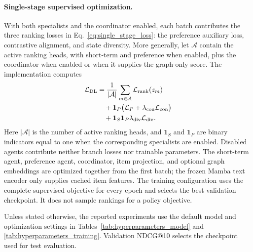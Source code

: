 ﻿\documentclass[sigconf,anonymous,review]{acmart}
\begin{document}
\paragraph{Single-stage supervised optimization.}
With both specialists and the coordinator enabled, each batch contributes the three ranking losses in Eq.~\eqref{eq:single_stage_loss}: the preference auxiliary loss, contrastive alignment, and state diversity. More generally, let $\mathcal A$ contain the active ranking heads, with short-term and preference when enabled, plus the coordinator when enabled or when it supplies the graph-only score. The implementation computes
\begin{align}
 \mathcal L_{\mathrm{DL}}&=\frac{1}{|\mathcal A|}\sum_{m\in\mathcal A}\mathcal L_{\mathrm{rank}}(z_m)\notag\\
 &\quad+\mathbf 1_P\bigl(\mathcal L_P+\lambda_{\mathrm{con}}\mathcal L_{\mathrm{con}}\bigr)\notag\\
 &\quad+\mathbf 1_S\mathbf 1_P\lambda_{\mathrm{div}}\mathcal L_{\mathrm{div}}.
\end{align}
Here $|\mathcal A|$ is the number of active ranking heads, and $\mathbf 1_S$ and $\mathbf 1_P$ are binary indicators equal to one when the corresponding specialists are enabled. Disabled agents contribute neither branch losses nor trainable parameters. The short-term agent, preference agent, coordinator, item projection, and optional graph embeddings are optimized together from the first batch; the frozen Mamba text encoder only supplies cached item features. The training configuration uses the complete supervised objective for every epoch and selects the best validation checkpoint. It does not sample rankings for a policy objective.

Unless stated otherwise, the reported experiments use the default model and optimization settings in Tables~\ref{tab:hyperparameters_model} and \ref{tab:hyperparameters_training}. Validation NDCG@10 selects the checkpoint used for test evaluation.

\end{document}
